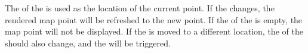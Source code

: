 The  of the  is used as the location of the current point. If the  changes, the rendered map point will be refreshed to the new point. If the  of the  is empty, the map point will not be displayed. If the  is moved to a different location, the  of the  should also change, and the   will be triggered.